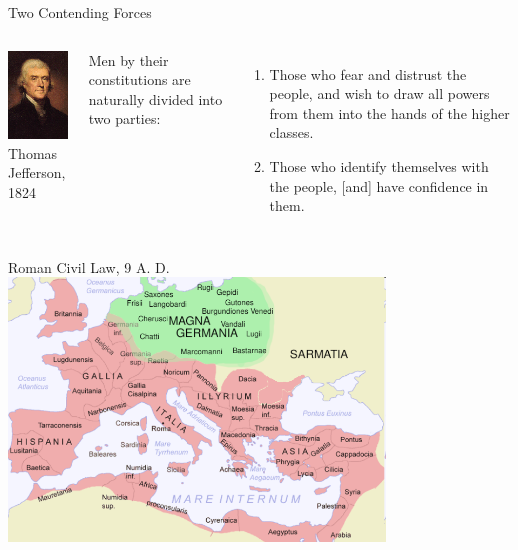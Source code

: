 \begin{frame}{Two Contending Forces}
    \begin{columns}[onlytextwidth]
            \centering
            \includegraphics[height=0.75\textheight]{img/jefferson.png} \\
            Thomas Jefferson, 1824

            Men by their constitutions are naturally divided into two parties: \\
            \begin{enumerate}
                \item Those who fear and distrust the people, and wish to draw all powers from them into the hands of the higher classes.
                \item Those who identify themselves with the people, [and] have confidence in them.
            \end{enumerate}
    \end{columns}
\end{frame}

\begin{frame}{Roman Civil Law, 9 A. D.}
    \centering
    \includegraphics[width=0.75\textwidth]{img/europe-map.png} \\
\end{frame}


